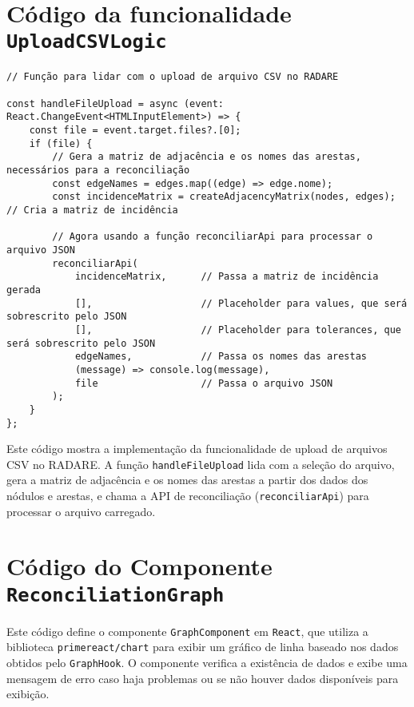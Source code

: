 \chapter{Código da funcionalidade \texttt{UploadCSVLogic}}
\label{Anexo:UploadCSVLogic}

\begin{verbatim}
// Função para lidar com o upload de arquivo CSV no RADARE

const handleFileUpload = async (event: React.ChangeEvent<HTMLInputElement>) => {
    const file = event.target.files?.[0];
    if (file) {
        // Gera a matriz de adjacência e os nomes das arestas, necessários para a reconciliação
        const edgeNames = edges.map((edge) => edge.nome);
        const incidenceMatrix = createAdjacencyMatrix(nodes, edges); // Cria a matriz de incidência
  
        // Agora usando a função reconciliarApi para processar o arquivo JSON
        reconciliarApi(
            incidenceMatrix,      // Passa a matriz de incidência gerada
            [],                   // Placeholder para values, que será sobrescrito pelo JSON
            [],                   // Placeholder para tolerances, que será sobrescrito pelo JSON
            edgeNames,            // Passa os nomes das arestas
            (message) => console.log(message),
            file                  // Passa o arquivo JSON
        );
    }
};
\end{verbatim}

Este código mostra a implementação da funcionalidade de upload de arquivos CSV no RADARE. A função \texttt{handleFileUpload} lida com a seleção do arquivo, gera a matriz de adjacência e os nomes das arestas a partir dos dados dos nódulos e arestas, e chama a API de reconciliação (\texttt{reconciliarApi}) para processar o arquivo carregado.
\chapter{Código do Componente \texttt{ReconciliationGraph}}
\label{Anexo:ReconciliationGraph}


Este código define o componente \texttt{GraphComponent} em \texttt{React}, que utiliza a biblioteca \texttt{primereact/chart} para exibir um gráfico de linha baseado nos dados obtidos pelo \texttt{GraphHook}. O componente verifica a existência de dados e exibe uma mensagem de erro caso haja problemas ou se não houver dados disponíveis para exibição.

